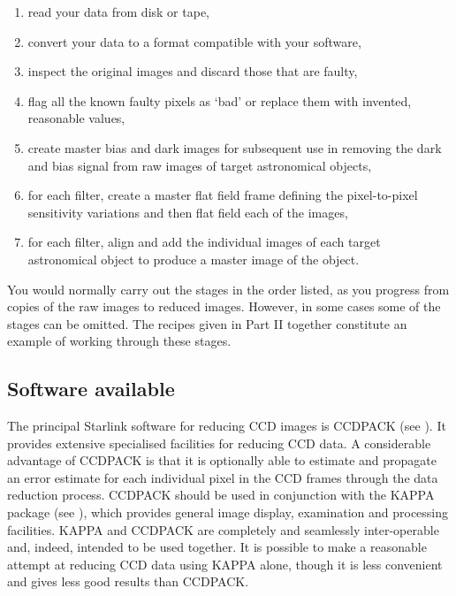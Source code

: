 \documentclass[twoside,11pt]{starlink}
\begin{document}
\begin{enumerate}

  \item read your data from disk or tape,

  \item convert your data to a format compatible with your software,

  \item inspect the original images and discard those that are faulty,

  \item flag all the known faulty pixels as `bad' or replace them with
   invented, reasonable values,

  \item create master bias and dark images for subsequent use in removing
   the dark and bias signal from raw images of target astronomical objects,

  \item for each filter, create a master flat field frame defining the
   pixel-to-pixel sensitivity variations and then flat field each of the
   images,

  \item for each filter, align and add the individual images of each
   target astronomical object to produce a master image of the object.

\end{enumerate}

You would normally carry out the stages in the order listed, as you progress
from copies of the raw images to reduced images.  However, in some cases
some of the stages can be omitted.  The recipes given in Part II together
constitute an example of working through these stages.

\subsection{\label{SOFTWARE}Software available}

The principal Starlink software for reducing CCD images is CCDPACK (see
\/\cite{SUN139}).  It provides extensive
specialised facilities for reducing CCD data.  A considerable advantage
of CCDPACK is that it is optionally able to estimate and propagate an
error estimate for each individual pixel in the CCD frames through the
data reduction process.  CCDPACK should be used in conjunction with the
KAPPA package (see \/\cite{SUN95}), which provides
general image display, examination and processing facilities.  KAPPA and
CCDPACK are completely and seamlessly inter-operable and, indeed, intended
to be used together.  It is possible to make a reasonable attempt at
reducing CCD data using KAPPA alone, though it is less convenient and gives
less good results than CCDPACK.
\end{document}
